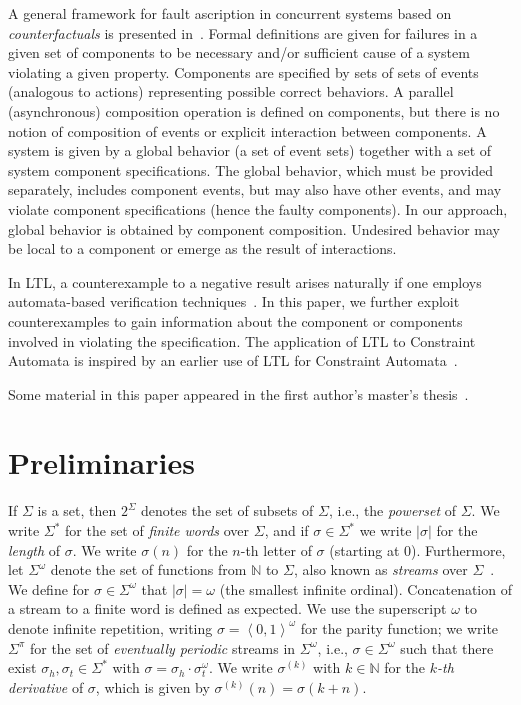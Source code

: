 \documentclass[a4paper]{article}
\newcommand{\naturals}{\mathbb{N}}
\newcommand{\angl}[1]{\left\langle#1\right\rangle}
\theoremstyle{definition}
\begin{document}
A general framework for fault ascription in concurrent systems based on \emph{counterfactuals} is presented in~\cite{goessler-astefanoaei-2014,goessler-stefani-2015}. Formal definitions are given for failures in a given set of components to be necessary and/or sufficient cause of a system violating a given property. Components are specified by sets of sets of events (analogous to actions) representing possible correct behaviors. A parallel (asynchronous) composition operation is defined on components, but there is no notion of composition of events or explicit interaction between components. A system is given by a global behavior (a set of event sets) together with a set of system component specifications. The global behavior, which must be provided separately, includes component events, but may also have other events, and may violate component specifications (hence the faulty components).  In our approach, global behavior is  obtained by component composition. Undesired behavior may be local to a component or emerge as the result of interactions.

In LTL, a counterexample to a negative result arises naturally if one employs automata-based verification techniques~\cite{muller-saoudi-schupp-1988,vardi-1995}. In this paper, we further exploit counterexamples to gain information about the component or components involved in violating the specification. The application of LTL to Constraint Automata is inspired by an earlier use of LTL for Constraint Automata~\cite{baier-blechmann-klein-kluppelholz-leister-2010}.

Some material in this paper appeared in the first author's master's thesis~\cite{kappe-2016-thesis}.

\section{Preliminaries}%
\label{section:preliminaries}

If $\Sigma$ is a set, then $2^\Sigma$ denotes the set of subsets of $\Sigma$, i.e., the \emph{powerset} of $\Sigma$. We write $\Sigma^*$ for the set of \emph{finite words} over $\Sigma$, and if $\sigma \in \Sigma^*$ we write $|\sigma|$ for the \emph{length} of $\sigma$. We write $\sigma(n)$ for the $n$-th letter of $\sigma$ (starting at $0$). Furthermore, let $\Sigma^\omega$ denote the set of functions from $\mathbb{N}$ to $\Sigma$, also known as \emph{streams} over $\Sigma$~\cite{rutten-2005}. We define for $\sigma \in \Sigma^\omega$ that $|\sigma| = \omega$ (the smallest infinite ordinal). Concatenation of a stream to a finite word is defined as expected. We use the superscript $\omega$ to denote infinite repetition, writing $\sigma = \angl{0,1}^\omega$ for the parity function; we write $\Sigma^\pi$ for the set of \emph{eventually periodic} streams in $\Sigma^\omega$, i.e., $\sigma \in \Sigma^\omega$ such that there exist $\sigma_h, \sigma_t \in \Sigma^*$ with $\sigma = \sigma_h \cdot \sigma_t^\omega$. We write $\sigma^{(k)}$ with $k \in \naturals$ for the \emph{$k$-th derivative} of $\sigma$, which is given by $\sigma^{(k)}(n) = \sigma(k+n)$.
\end{document}
